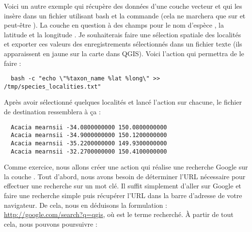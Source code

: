 Voici un autre exemple qui r\'ecup\`ere des donn\'ees d'une couche vecteur et qui les ins\`ere dans un fichier utilisant bash et la commande  (cela ne marchera que sur \nix et peut-\^etre \osx). La couche en question \`a des champs pour le nom d'esp\`ece , la latitude  et la longitude . Je souhaiterais faire une s\'election spatiale des localit\'es et exporter ces valeurs des enregistrements s\'electionn\'es dans un fichier texte (ils apparaissent en jaune sur la carte dans QGIS). Voici l'action qui permettra de le faire :

\begin{verbatim}
  bash -c "echo \"%taxon_name %lat %long\" >> /tmp/species_localities.txt"
\end{verbatim}

Apr\`es avoir s\'electionn\'e quelques localit\'es et lanc\'e l'action sur chacune, le fichier de destination ressemblera \`a \c{c}a :

\begin{verbatim}
  Acacia mearnsii -34.0800000000 150.0800000000
  Acacia mearnsii -34.9000000000 150.1200000000
  Acacia mearnsii -35.2200000000 149.9300000000
  Acacia mearnsii -32.2700000000 150.4100000000
\end{verbatim}

Comme exercice, nous allons cr\'eer une action qui r\'ealise une recherche Google sur la couche . Tout d'abord, nous avons besoin de d\'eterminer l'URL n\'ecessaire pour effectuer une recherche sur un mot cl\'e. Il suffit simplement d'aller sur Google et faire une recherche simple puis r\'ecup\'erer l'URL dans la barre d'adresse de votre navigateur. De cela, nous en d\'eduisons la formulation : \url{http://google.com/search?q=qgis}, o\`u  est le terme recherch\'e. \`A partir de tout cela, nous pouvons poursuivre :

